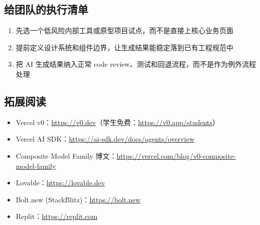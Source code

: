 \documentclass[a4paper]{article}
\begin{document}
\subsection{给团队的执行清单}

\begin{enumerate}
    \item 先选一个低风险内部工具或原型项目试点，而不是直接上核心业务页面
    \item 提前定义设计系统和组件边界，让生成结果能稳定落到已有工程规范中
    \item 把 AI 生成结果纳入正常 code review、测试和回退流程，而不是作为例外流程处理
\end{enumerate}

\subsection{拓展阅读}

\begin{itemize}
    \item Vercel v0：\url{https://v0.dev}（学生免费：\url{https://v0.app/students}）
    \item Vercel AI SDK：\url{https://ai-sdk.dev/docs/agents/overview}
    \item Composite Model Family 博文：\url{https://vercel.com/blog/v0-composite-model-family}
    \item Lovable：\url{https://lovable.dev}
    \item Bolt.new (StackBlitz)：\url{https://bolt.new}
    \item Replit：\url{https://replit.com}
\end{itemize}

\end{document}

